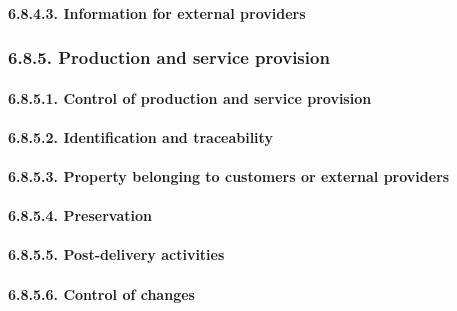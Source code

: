 \documentclass[
]{article}
\begin{document}
\hypertarget{information-for-external-providers-1}{%
\paragraph{6.8.4.3. Information for external
providers}\label{information-for-external-providers-1}}

\hypertarget{production-and-service-provision-1}{%
\subsubsection{6.8.5. Production and service
provision}\label{production-and-service-provision-1}}

\hypertarget{control-of-production-and-service-provision-1}{%
\paragraph{6.8.5.1. Control of production and service
provision}\label{control-of-production-and-service-provision-1}}

\hypertarget{identification-and-traceability-1}{%
\paragraph{6.8.5.2. Identification and
traceability}\label{identification-and-traceability-1}}

\hypertarget{property-belonging-to-customers-or-external-providers-1}{%
\paragraph{6.8.5.3. Property belonging to customers or external
providers}\label{property-belonging-to-customers-or-external-providers-1}}

\hypertarget{preservation-1}{%
\paragraph{6.8.5.4. Preservation}\label{preservation-1}}

\hypertarget{post-delivery-activities-1}{%
\paragraph{6.8.5.5. Post-delivery
activities}\label{post-delivery-activities-1}}

\hypertarget{control-of-changes-1}{%
\paragraph{6.8.5.6. Control of changes}\label{control-of-changes-1}}
\end{document}
